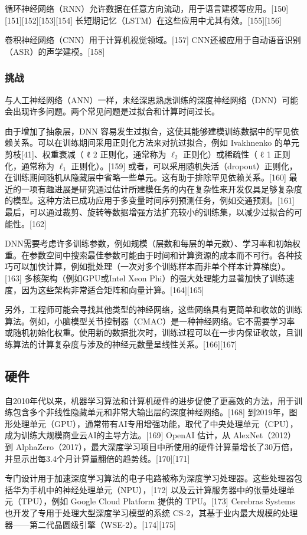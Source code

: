 循环神经网络（RNN）允许数据在任意方向流动，用于语言建模等应用。[150][151][152][153][154] 长短期记忆（LSTM）在这些应用中尤其有效。[155][156]  

卷积神经网络（CNN）用于计算机视觉领域。[157] CNN还被应用于自动语音识别（ASR）的声学建模。[158]  
\subsubsection{挑战}
与人工神经网络（ANN）一样，未经深思熟虑训练的深度神经网络（DNN）可能会出现许多问题。两个常见问题是过拟合和计算时间过长。

由于增加了抽象层，DNN 容易发生过拟合，这使其能够建模训练数据中的罕见依赖关系。可以在训练期间采用正则化方法来对抗过拟合，例如 Ivakhnenko 的单元剪枝[41]、权重衰减（
ℓ
2
正则化，通常称为 \( \ell_2 \) 正则化）或稀疏性（
ℓ
1
正则化，通常称为 \( \ell_1 \) 正则化）。[159] 或者，可以采用随机失活（dropout）正则化，在训练期间随机从隐藏层中省略一些单元。这有助于排除罕见依赖关系。[160] 最近的一项有趣进展是研究通过估计所建模任务的内在复杂性来开发仅具足够复杂度的模型。这种方法已成功应用于多变量时间序列预测任务，例如交通预测。[161] 最后，可以通过裁剪、旋转等数据增强方法扩充较小的训练集，以减少过拟合的可能性。[162]

DNN需要考虑许多训练参数，例如规模（层数和每层的单元数）、学习率和初始权重。在参数空间中搜索最佳参数可能由于时间和计算资源的成本而不可行。各种技巧可以加快计算，例如批处理（一次对多个训练样本而非单个样本计算梯度）。[163] 多核架构（例如GPU或Intel Xeon Phi）的强大处理能力显著加快了训练速度，因为这些架构非常适合矩阵和向量计算。[164][165]

另外，工程师可能会寻找其他类型的神经网络，这些网络具有更简单和收敛的训练算法。例如，小脑模型关节控制器（CMAC）是一种神经网络。它不需要学习率或随机初始化权重。使用新的数据批次时，训练过程可以在一步内保证收敛，且训练算法的计算复杂度与涉及的神经元数量呈线性关系。[166][167]
\subsection{硬件}
自2010年代以来，机器学习算法和计算机硬件的进步促使了更高效的方法，用于训练包含多个非线性隐藏单元和非常大输出层的深度神经网络。[168] 到2019年，图形处理单元（GPU），通常带有AI专用增强功能，取代了中央处理单元（CPU），成为训练大规模商业云AI的主导方法。[169] OpenAI 估计，从 AlexNet（2012）到 AlphaZero（2017），最大深度学习项目中所使用的硬件计算量增长了30万倍，并显示出每3.4个月计算量翻倍的趋势线。[170][171]

专门设计用于加速深度学习算法的电子电路被称为深度学习处理器。这些处理器包括华为手机中的神经处理单元（NPU），[172] 以及云计算服务器中的张量处理单元（TPU），例如 Google Cloud Platform 提供的 TPU。[173] Cerebras Systems 也开发了专用于处理大型深度学习模型的系统 CS-2，其基于业内最大规模的处理器——第二代晶圆级引擎（WSE-2）。[174][175]

